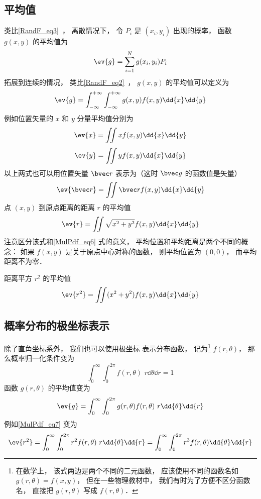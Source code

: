 \subsection{平均值}
类比\autoref{RandF_eq3}~， 离散情况下， 令 $P_i$ 是 $(x_i, y_i)$ 出现的概率， 函数 $g(x,y)$ 的平均值为
\begin{equation}
\ev{g} = \sum_{i=1}^N g(x_i, y_i) P_i
\end{equation}
拓展到连续的情况， 类比\autoref{RandF_eq2}~， $g(x, y)$ 的平均值可以定义为
\begin{equation}
\ev{g} =  \int_{-\infty}^{+\infty} \int_{-\infty}^{+\infty} g(x, y) f(x, y) \dd{x} \dd{y}
\end{equation}
例如位置矢量的 $x$ 和 $y$ 分量平均值分别为
\begin{equation}\label{MulPdf_eq2}
\ev{x} = \iint x f(x, y) \dd{x}\dd{y}
\end{equation}
\begin{equation}
\ev{y} = \iint y f(x, y) \dd{x}\dd{y}
\end{equation}
以上两式也可以用位置矢量 $\bvec r$ 表示为（这时 $\bvec g$ 的函数值是矢量）
\begin{equation}\label{MulPdf_eq6}
\ev{\bvec r} = \iint \bvec r f(x, y) \dd{x}\dd{y}
\end{equation}
点 $(x,y)$ 到原点距离的距离 $r$ 的平均值
\begin{equation}
\ev{r} = \iint \sqrt{x^2 + y^2} f(x, y) \dd{x}\dd{y}
\end{equation}
注意区分该式和\autoref{MulPdf_eq6} 式的意义， 平均位置和平均距离是两个不同的概念： 如果 $f(x, y)$ 是关于原点中心对称的函数， 则平均位置为 $(0, 0)$， 而平均距离不为零．

距离平方 $r^2$ 的平均值
\begin{equation}\label{MulPdf_eq7}
\ev{r^2} = \iint (x^2 + y^2) f(x, y) \dd{x}\dd{y}
\end{equation}

\subsection{概率分布的极坐标表示}

除了直角坐标系外， 我们也可以使用极坐标 表示分布函数， 记为\footnote{在数学上， 该式两边是两个不同的二元函数， 应该使用不同的函数名如 $g(r, \theta) = f(x, y)$， 但在一些物理教材中， 我们有时为了方便不区分函数名， 直接把 $g(r, \theta)$ 写成 $f(r, \theta)$．} $f(r, \theta)$， 那么概率归一化条件变为
\begin{equation}\label{MulPdf_eq1}
\int_0^\infty \int_{0}^{2\pi} f(r, \theta)\,\, r\dd{\theta}\dd{r} = 1
\end{equation}
函数 $g(r, \theta)$ 的平均值变为
\begin{equation}
\ev{g} = \int_0^\infty \int_{0}^{2\pi} g(r, \theta) f(r, \theta)\,\, r\dd{\theta}\dd{r}
\end{equation}
例如\autoref{MulPdf_eq7} 变为
\begin{equation}\label{MulPdf_eq3}
\ev{r^2} = \int_0^\infty \int_{0}^{2\pi} r^2 f(r, \theta)\,\, r\dd{\theta}\dd{r}
= \int_0^\infty \int_{0}^{2\pi} r^3 f(r, \theta) \dd{\theta}\dd{r}
\end{equation}

